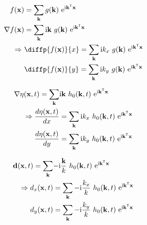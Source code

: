 \begin{align}
 f(\mvec{x}) &= \sum_{\mvec{k}}g(\mvec{k})~\mathrm{e}^{\mathrm{i}\transpose{\mvec{k}}\mvec{x}} \\
 \nabla f(\mvec{x}) &= \sum_{\mvec{k}}\mathrm{i}\mvec{k}~g(\mvec{k})~\mathrm{e}^{\mathrm{i}\transpose{\mvec{k}}\mvec{x}} \\
 \Rightarrow~&\diffp{f(\mvec{x})}{x} = \sum_{\mvec{k}}\mathrm{i}k_{x}~g(\mvec{k})~\mathrm{e}^{\mathrm{i}\transpose{\mvec{k}}\mvec{x}} \\
 &\diffp{f(\mvec{x})}{y} = \sum_{\mvec{k}}\mathrm{i}k_{y}~g(\mvec{k})~\mathrm{e}^{\mathrm{i}\transpose{\mvec{k}}\mvec{x}}
\end{align}

\begin{align}
\nabla\eta(\mathbf{x},t) =
\sum_{\mathbf{k}}&\mathrm{i}\mathbf{k}~h_0(\mathbf{k},t)
~\mathrm{e}^{\mathrm{i}\mathbf{k}^{\mathsf{T}}\mathbf{x}} \\
\Rightarrow \frac{d\eta(\mathbf{x},t)}{dx} &=
\sum_{\mathbf{k}}\mathrm{i}k_x~h_0(\mathbf{k},t)
~\mathrm{e}^{\mathrm{i}\mathbf{k}^{\mathsf{T}}\mathbf{x}} \\
\frac{d\eta(\mathbf{x},t)}{dy} &=
\sum_{\mathbf{k}}\mathrm{i}k_y~h_0(\mathbf{k},t)
~\mathrm{e}^{\mathrm{i}\mathbf{k}^{\mathsf{T}}\mathbf{x}}
\end{align}

\begin{align}
\mathbf{d}(\mathbf{x},t) =
\sum_{\mathbf{k}}&\mathrm{-i}\frac{\mathbf{k}}{k}~h_0(\mathbf{k},t)
~\mathrm{e}^{\mathrm{i}\mathbf{k}^{\mathsf{T}}\mathbf{x}} \\
\Rightarrow d_x(\mathbf{x},t) &=
\sum_{\mathbf{k}}\mathrm{-i}\frac{k_x}{k}~h_0(\mathbf{k},t)
~\mathrm{e}^{\mathrm{i}\mathbf{k}^{\mathsf{T}}\mathbf{x}} \\
d_y(\mathbf{x},t) &=
\sum_{\mathbf{k}}\mathrm{-i}\frac{k_y}{k}~h_0(\mathbf{k},t)
~\mathrm{e}^{\mathrm{i}\mathbf{k}^{\mathsf{T}}\mathbf{x}}
\end{align}

\newcommand{\mcomplex}[2]{\ensuremath{{#1}{#2}\mathrm{i}}}


\def\SP{\hspace{5pt}}

